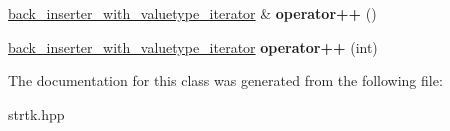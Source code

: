 \begin{DoxyCompactItemize}
\item 
\hypertarget{classstrtk_1_1back__inserter__with__valuetype__iterator_a15f5fe3d9eadea4ead4f4cf36cfc6a52}{\hyperlink{classstrtk_1_1back__inserter__with__valuetype__iterator}{back\-\_\-inserter\-\_\-with\-\_\-valuetype\-\_\-iterator} \& {\bfseries operator++} ()}\label{classstrtk_1_1back__inserter__with__valuetype__iterator_a15f5fe3d9eadea4ead4f4cf36cfc6a52}

\item 
\hypertarget{classstrtk_1_1back__inserter__with__valuetype__iterator_a295a708547f62187ea69eb749eeded9c}{\hyperlink{classstrtk_1_1back__inserter__with__valuetype__iterator}{back\-\_\-inserter\-\_\-with\-\_\-valuetype\-\_\-iterator} {\bfseries operator++} (int)}\label{classstrtk_1_1back__inserter__with__valuetype__iterator_a295a708547f62187ea69eb749eeded9c}

\end{DoxyCompactItemize}


The documentation for this class was generated from the following file\-:\begin{DoxyCompactItemize}
\item 
strtk.\-hpp\end{DoxyCompactItemize}
